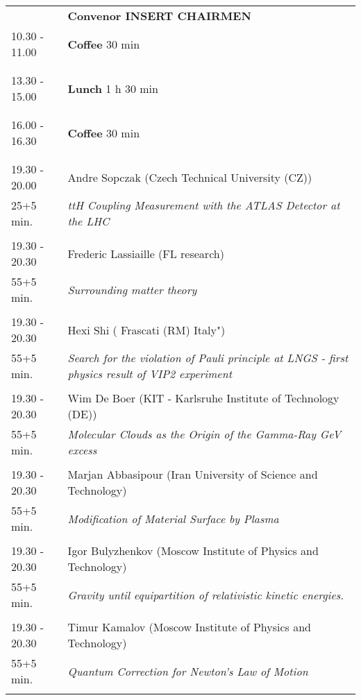 \begin{longtable}{p{3cm}p{13cm}}
&\hfill {\bf Convenor INSERT CHAIRMEN }\\ 
10.30 - 11.00 & {\bf Coffee} \hfill 30 min \\ 
 & \\ 
 & \\ 
13.30 - 15.00 & {\bf Lunch} \hfill 1 h 30 min \\ 
 & \\ 
 & \\ 
16.00 - 16.30 & {\bf Coffee} \hfill 30 min \\ 
 & \\ 
 & \\ 
19.30 - 20.00 & Andre Sopczak (Czech Technical University (CZ))\\ 
25+5 min. & {\it ttH Coupling Measurement with the ATLAS Detector at the LHC}\\ 
 & \\ 
19.30 - 20.30 & Frederic Lassiaille (FL research)\\ 
55+5 min. & {\it Surrounding matter theory}\\ 
 & \\ 
19.30 - 20.30 & Hexi Shi ( Frascati (RM) Italy")\\ 
55+5 min. & {\it Search for the violation of Pauli principle at LNGS - first physics result of VIP2 experiment}\\ 
 & \\ 
19.30 - 20.30 & Wim De Boer (KIT - Karlsruhe Institute of  Technology (DE))\\ 
55+5 min. & {\it Molecular Clouds as the Origin of the Gamma-Ray GeV excess}\\ 
 & \\ 
19.30 - 20.30 & Marjan Abbasipour (Iran University of Science and Technology)\\ 
55+5 min. & {\it Modification of Material Surface by Plasma}\\ 
 & \\ 
19.30 - 20.30 & Igor Bulyzhenkov (Moscow Institute of Physics and Technology)\\ 
55+5 min. & {\it Gravity until equipartition of relativistic kinetic energies.}\\ 
 & \\ 
19.30 - 20.30 & Timur Kamalov (Moscow Institute of Physics and Technology)\\ 
55+5 min. & {\it Quantum Correction for Newton’s Law of Motion}\\ 
 & \\ 

\end{longtable}
